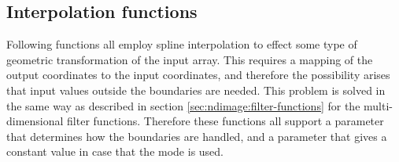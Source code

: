 \subsection{Interpolation functions}
\label{sec:ndimage:interpolation}
Following functions all employ spline interpolation to effect some type of
geometric transformation of the input array. This requires a mapping of the
output coordinates to the input coordinates, and therefore the possibility
arises that input values outside the boundaries are needed. This problem 
is solved in the same way as described in section
\ref{sec:ndimage:filter-functions} for the multi-dimensional filter 
functions. Therefore these functions all support a  parameter 
that determines how the boundaries are handled, and a  parameter 
that gives a constant value in case that the  mode is 
used.

